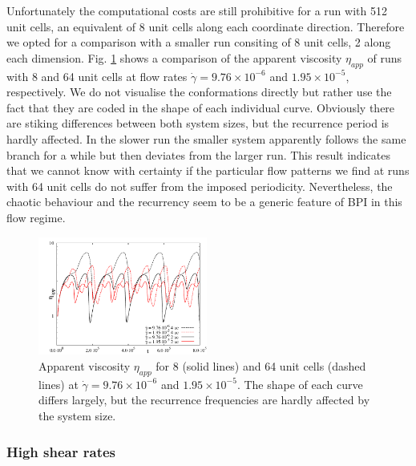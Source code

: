 \documentclass[aps,pre,reprint,superscriptaddress, twocolumn]{revtex4}
\newcommand{\e}[1]{\times10^{#1}}
\newcommand{\gd}{\dot{\gamma}}
\begin{document}
Unfortunately the computational costs are still prohibitive for a run 
with 512 unit cells, an equivalent of 8 unit cells along each coordinate 
direction. Therefore we opted for a comparison with a smaller run consiting
of 8 unit cells, 2 along each dimension.
Fig. \ref{bp1-2uc4uc} shows a comparison of the apparent viscosity $\eta_{app}$ 
of runs with 8 and 64 unit cells at flow rates 
$\gd=9.76\e{-6}$ and $1.95\e{-5}$, respectively.
We do not visualise the conformations directly but rather use the fact that 
they are coded in the shape of each individual curve. Obviously there 
are stiking differences between 
both system sizes, but the recurrence period is hardly affected. In the slower
run the smaller system apparently follows the same branch for a while but then
deviates from the larger run. 
This result indicates that we cannot know with certainty if the particular flow patterns 
we find at runs with 64 unit cells do not suffer from the imposed periodicity.
Nevertheless, the chaotic behaviour and the recurrency seem to be a generic
feature of BPI in this flow regime.
 
\begin{figure}[htpb]
\includegraphics[width=0.495\textwidth]{stress_bp1_2uc_4uc.pdf}
\caption{Apparent viscosity $\eta_{app}$ for 8 (solid lines) and 64 unit cells (dashed lines)
at $\gd=9.76\e{-6}$ and $1.95\e{-5}$. The shape of each curve differs largely, but the recurrence frequencies are hardly affected by the system size.}
\label{bp1-2uc4uc}
\end{figure}

\subsubsection{High shear rates}
\end{document}
